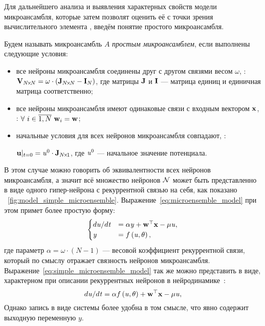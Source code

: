 Для дальнейшего анализа и выявления характерных свойств модели микроансамбля, которые затем позволят оценить её с точки зрения вычислительного элемента , введём понятие простого микроансамбля.
\begin{Definition*}
    Будем называть микроансамбль $A$ \textit{простым микроансамблем}, если выполнены следующие условия:
    \begin{itemize}
        \item все нейроны микроансамбля соединены друг с другом связями весом $\omega$, \ie: $\mathrm{\mathbf{V}}_{N\!\times\!N} = \omega \cdot \left( \mathrm{\mathbf{J}}_{N\!\times\!N} - \mathrm{\mathbf{I}}_{N} \right)$, где матрицы $\mathrm{\mathbf{J}}$ и $\mathrm{\mathbf{I}}$  --- матрица единиц и единичная матрица соответственно;
        \item все нейроны микроансамбля имеют одинаковые связи с входным вектором $\mathrm{\mathbf{x}}$, \ie: $\forall\ i \in \overline{1,N}\ \mathrm{\mathbf{w}}_{i} = \mathrm{\mathbf{w}}$;
        \item начальные условия для всех нейронов микроансамбля совпадают, \ie: \par $\mathrm{\mathbf{u}}|_{t=0} = \mathit{u}^{0} \cdot \mathrm{\mathbf{J}}_{N\!\times\!1}$, где $\mathit{u}^{0}$ --- начальное значение потенциала.
    \end{itemize}
\end{Definition*}

В этом случае можно говорить об эквивалентности всех нейронов микроансамбля, а значит всё множество нейронов $\mathcal{N}$ может быть представленно в виде одного гипер-нейрона с рекуррентной связью на себя, как показано \onfigure~\ref{fig:model_simple_microensemble}. Выражение~\eqref{eq:microensemble_model} при этом примет более простую форму:
\begin{equation}
    \label{eq:simple_microensemble_model}
    \begin{cases}
    d\mathit{u}/d\mathit{t} &= \alpha \mathit{y} + \mathrm{\mathbf{w}}^{\top} \mathrm{\mathbf{x}} - \mu \mathit{u}, \\
    \mathit{y}              &= f\left( \mathit{u}, \theta \right), \\
    \end{cases}
\end{equation}
где параметр $\alpha = \omega \cdot \left( N - 1 \right)$ --- весовой коэффициент рекуррентной связи, который по смыслу отражает связность нейронов микроансамбля. Выражение~\eqref{eq:simple_microensemble_model} так же можно представить в виде, характерном при описании рекуррентных нейронов в нейродинамике~\cite{Haykin2008}:
\begin{equation}
    \nonumber
    d\mathit{u}/d\mathit{t} = \alpha f\left( \mathit{u}, \theta \right) + \mathrm{\mathbf{w}}^{\top} \mathrm{\mathbf{x}} - \mu \mathit{u},
\end{equation}
Однако запись в виде системы более удобна в том смысле, что явно содержит выходную переменную $y$.

